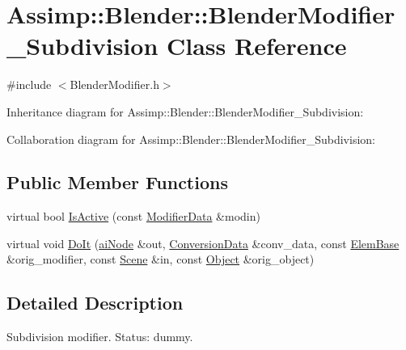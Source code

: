 \hypertarget{class_assimp_1_1_blender_1_1_blender_modifier___subdivision}{\section{Assimp\+:\+:Blender\+:\+:Blender\+Modifier\+\_\+\+Subdivision Class Reference}
\label{class_assimp_1_1_blender_1_1_blender_modifier___subdivision}
}


{\ttfamily \#include $<$Blender\+Modifier.\+h$>$}



Inheritance diagram for Assimp\+:\+:Blender\+:\+:Blender\+Modifier\+\_\+\+Subdivision\+:


Collaboration diagram for Assimp\+:\+:Blender\+:\+:Blender\+Modifier\+\_\+\+Subdivision\+:
\subsection*{Public Member Functions}
\begin{DoxyCompactItemize}
\item 
virtual bool \hyperlink{class_assimp_1_1_blender_1_1_blender_modifier___subdivision_aa00790f5b621339efcd452a8f56b0ae3}{Is\+Active} (const \hyperlink{struct_assimp_1_1_blender_1_1_modifier_data}{Modifier\+Data} \&modin)
\item 
virtual void \hyperlink{class_assimp_1_1_blender_1_1_blender_modifier___subdivision_a73e025dfe4fb3b41a2b90d5bf017015a}{Do\+It} (\hyperlink{structai_node}{ai\+Node} \&out, \hyperlink{struct_assimp_1_1_blender_1_1_conversion_data}{Conversion\+Data} \&conv\+\_\+data, const \hyperlink{struct_assimp_1_1_blender_1_1_elem_base}{Elem\+Base} \&orig\+\_\+modifier, const \hyperlink{struct_assimp_1_1_blender_1_1_scene}{Scene} \&in, const \hyperlink{struct_assimp_1_1_blender_1_1_object}{Object} \&orig\+\_\+object)
\end{DoxyCompactItemize}


\subsection{Detailed Description}
Subdivision modifier. Status\+: dummy. 

